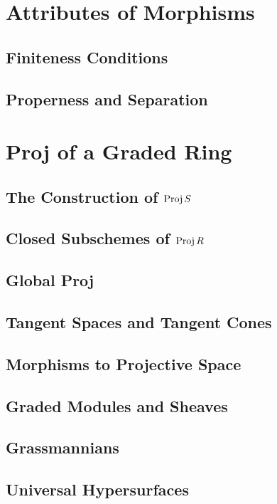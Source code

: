 \documentclass[oneside]{amsbook}
\numberwithin{ex}{chapter}
\begin{document}
\section{Attributes of Morphisms}
\subsection{Finiteness Conditions}

\subsection{Properness and Separation}


\section{Proj of a Graded Ring}
\subsection{The Construction of $\operatorname{Proj} S$}

\subsection{Closed Subschemes of $\operatorname{Proj} R$}

\subsection{Global Proj}

\subsection{Tangent Spaces and Tangent Cones}

\subsection{Morphisms to Projective Space}

\subsection{Graded Modules and Sheaves}

\subsection{Grassmannians}

\subsection{Universal Hypersurfaces}

\end{document}
